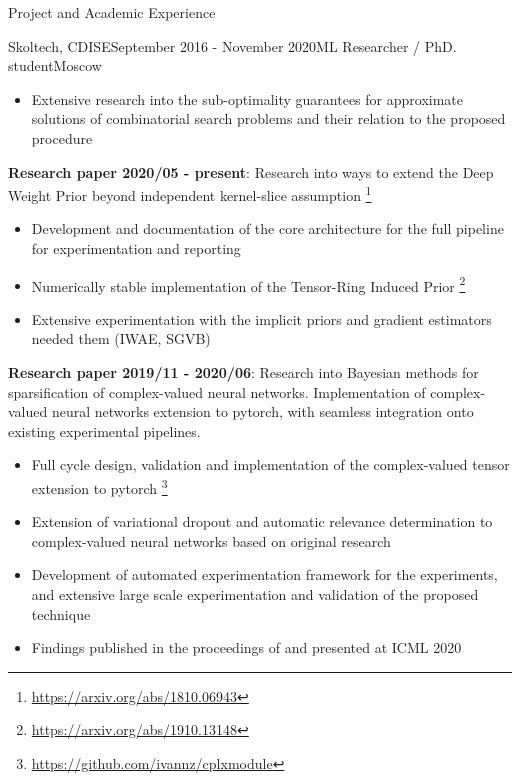\documentclass{resume} %
\begin{document}
\begin{rSection}{Project and Academic Experience}
\begin{rSubsection}{Skoltech, CDISE}{September 2016 - November 2020}{ML Researcher / PhD. student}{Moscow}
\begin{itemize}
        \item Extensive research into the sub-optimality guarantees for approximate solutions
        of combinatorial search problems and their relation to the proposed procedure
    \end{itemize}

    \medskip
    \item \textbf{Research paper 2020/05 - present}:
    Research into ways to extend the Deep Weight Prior beyond independent kernel-slice assumption%
        \footnote{\url{https://arxiv.org/abs/1810.06943}}
    \begin{itemize}
        \item Development and documentation of the core architecture for the full pipeline for
        experimentation and reporting
        
        \item Numerically stable implementation of the Tensor-Ring Induced Prior%
            \footnote{\url{https://arxiv.org/abs/1910.13148}}
        
        \item Extensive experimentation with the implicit priors and gradient estimators
        needed them (IWAE, SGVB)
    \end{itemize}

    \medskip
    \item \textbf{Research paper 2019/11 - 2020/06}:
    Research into Bayesian methods for sparsification of complex-valued neural networks.
    Implementation of complex-valued neural networks extension to pytorch, with seamless
    integration onto existing experimental pipelines. \begin{itemize}
        \item Full cycle design, validation and implementation of the complex-valued tensor
        extension to pytorch%
            \footnote{\url{https://github.com/ivannz/cplxmodule}}
        
        \item Extension of variational dropout and automatic relevance determination to
        complex-valued neural networks based on original research
        
        \item Development of automated experimentation framework for the experiments, and
        extensive large scale experimentation and validation of the proposed technique
        
        \item Findings published in the proceedings of and presented at ICML 2020
    \end{itemize}


\end{rSubsection}
\end{rSection}
\end{document}
